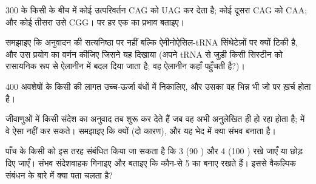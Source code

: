 \begin{exercise}[$\star\star$]\label{exo:b1:gene-expression:7}
\qty{300}{}  के किसी  के बीच में कोई उत्परिवर्तन  CAG को
UAG कर देता है; कोई दूसरा CAG को CAA; और कोई तीसरा उसे
CGG।  पर हर एक का प्रभाव बताइए।
\end{exercise}

\begin{exercise}[$\star\star$]\label{exo:b1:gene-expression:8}
समझाइए कि अनुवादन की सत्यनिष्ठा  पर नहीं बल्कि
ऐमीनोऐसिल-tRNA सिंथेटेज़ों पर क्यों टिकी है, और उस प्रयोग का वर्णन कीजिए
जिसने यह दिखाया (अपने tRNA से जुड़ी किसी सिस्टीन को रासायनिक रूप से
ऐलानीन में बदल दिया जाता है; वह ऐलानीन कहाँ पहुँचती है?)।
\end{exercise}

\begin{exercise}[$\star\star$]\label{exo:b1:gene-expression:9}
\qty{400}{} अवशेषों के किसी  की लागत उच्च-ऊर्जा बंधों में
निकालिए, और उसका वह भिन्न भी जो  पर ख़र्च होता है।
\end{exercise}

\begin{exercise}[$\star\star\star$]\label{exo:b1:gene-expression:10}
जीवाणुओं में  किसी संदेश का अनुवाद तब शुरू कर देते हैं जब वह अभी
अनुलेखित ही हो रहा होता है;  में वे ऐसा नहीं कर सकते।
समझाइए कि क्यों (दो कारण), और यह भेद  में क्या संभव बनाता है।
\end{exercise}

\begin{exercise}[$\star\star\star$]\label{exo:b1:gene-expression:11}
पाँच  के किसी  को इस तरह संबंधित किया जा सकता है कि  3
(\qty{90}{} ) और  4 (\qty{100}{} )
रखे जाएँ या छोड़ दिए जाएँ। संभव संदेशवाहक गिनाइए और बताइए कि कौन-से
 5 का  बनाए रखते हैं। इससे वैकल्पिक संबंधन के बारे में
क्या पता चलता है?
\end{exercise}

